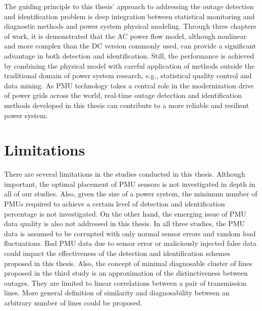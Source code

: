 The guiding principle to this thesis' approach to addressing the outage detection and identification problem is deep integration between statistical monitoring and diagnostic methods and power system physical modeling. Through three chapters of work, it is demonstrated that the AC power flow model, although nonlinear and more complex than the DC version commonly used, can provide a significant advantage in both detection and identification. Still, the performance is achieved by combining the physical model with careful application of methods outside the traditional domain of power system research, e.g., statistical quality control and data mining. As PMU technology takes a central role in the modernization drive of power grids across the world, real-time outage detection and identification methods developed in this thesis can contribute to a more reliable and resilient power system. 

\section{Limitations}
There are several limitations in the studies conducted in this thesis. Although important, the optimal placement of PMU sensors is not investigated in depth in all of our studies. Also, given the size of a power system, the minimum number of PMUs required to achieve a certain level of detection and identification percentage is not investigated. On the other hand, the emerging issue of PMU data quality is also not addressed in this thesis. In all three studies, the PMU data is assumed to be corrupted with only normal sensor errors and random load fluctuations. Bad PMU data due to sensor error or maliciously injected false data could impact the effectiveness of the detection and identification schemes proposed in this thesis. Also, the concept of minimal diagnosable cluster of lines proposed in the third study is an approximation of the distinctiveness between outages. They are limited to linear correlations between a pair of transmission lines. More general definition of similarity and diagnosability between an arbitrary number of lines could be proposed. 

